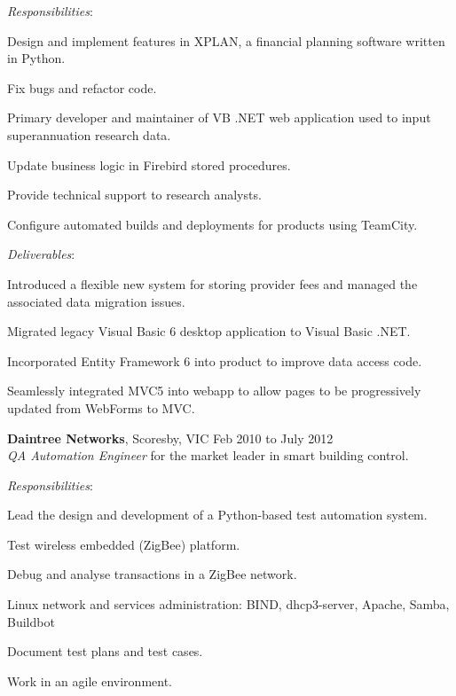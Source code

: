 \documentclass[line,margin]{res}
\begin{document}
\begin{resume}
        \textit{Responsibilities}:
        \begin{list}{}{\leftmargin=1em \itemsep=-2pt}
            \item{Design and implement features in XPLAN, a financial planning software written in Python.}
            \item{Fix bugs and refactor code.}
            \item{Primary developer and maintainer of VB .NET web application used to input superannuation
                research data.}
            \item{Update business logic in Firebird stored procedures.}
            \item{Provide technical support to research analysts.}
            \item{Configure automated builds and deployments for products using TeamCity.}
        \end{list}

        \textit{Deliverables}:
        \begin{list}{}{\leftmargin=1em \itemsep=-2pt}
            \item{Introduced a flexible new system for storing provider fees and managed the
                associated data migration issues.}
            \item{Migrated legacy Visual Basic 6 desktop application to Visual Basic .NET.}
            \item{Incorporated Entity Framework 6 into product to improve data access code.}
            \item{Seamlessly integrated MVC5 into webapp to allow pages to be
                progressively updated from WebForms to MVC.}
        \end{list}

        \textbf{Daintree Networks}, Scoresby, VIC \hfill Feb 2010 to July 2012 \\
        \textit{QA Automation Engineer} for the market leader in smart building control.

        \textit{Responsibilities}:
        \begin{list}{}{\leftmargin=1em \itemsep=-2pt}
            \item{Lead the design and development of a Python-based test automation system.}
            \item{Test wireless embedded (ZigBee) platform.}
            \item{Debug and analyse transactions in a ZigBee network.}
            \item{Linux network and services administration: BIND, dhcp3-server, Apache, Samba, Buildbot}
            \item{Document test plans and test cases.}
            \item{Work in an agile environment.}
        \end{list}


\end{resume}
\end{document}
